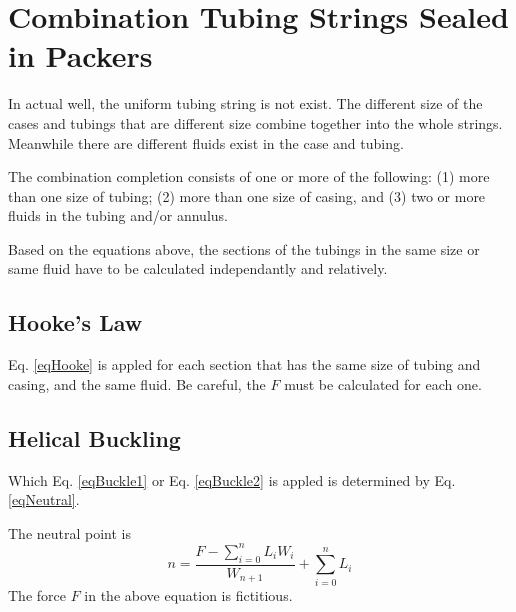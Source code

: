 \documentclass{article}
\begin{document}
\section{Combination Tubing Strings Sealed in Packers}
In actual well, the uniform tubing string is not exist. The different size of
the cases and tubings that are different size combine together into the whole
strings. Meanwhile there are different fluids exist in the case and tubing.

The combination completion consists of one or more of the following: (1) more
than one size of tubing; (2) more than one size of casing, and (3) two or more
fluids in the tubing and/or annulus.

Based on the equations above, the sections of the tubings in the same size or
same fluid have to be calculated independantly and relatively.

\subsection{Hooke's Law}
Eq. \ref{eqHooke} is appled for each section that has the same size of tubing
and casing, and the same fluid. Be careful, the $F$ must be calculated for
each one.

\subsection{Helical Buckling}
Which Eq. \ref{eqBuckle1} or Eq. \ref{eqBuckle2} is appled is determined by
Eq. \ref{eqNeutral}.

The neutral point is 
\begin{equation}
n= \frac{F - \sum_{i=0}^n{L_iW_i}}{W_{n+1}} + \sum_{i=0}^nL_i
\end{equation}
The force $F$ in the above equation is fictitious.
\end{document}
